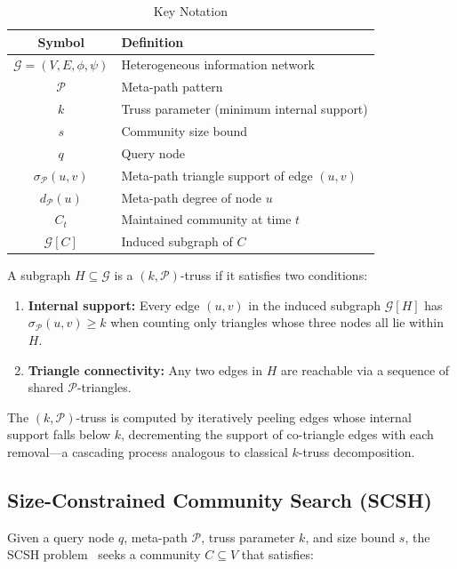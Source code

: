 \begin{table}[htbp]
\centering
\caption{Key Notation}
\label{tab:notation}
\begin{tabular}{c l}
\toprule
Symbol & Definition \\
\midrule
$\mathcal{G} = (V, E, \phi, \psi)$ & Heterogeneous information network \\
$\mathcal{P}$ & Meta-path pattern \\
$k$ & Truss parameter (minimum internal support) \\
$s$ & Community size bound \\
$q$ & Query node \\
$\sigma_{\mathcal{P}}(u,v)$ & Meta-path triangle support of edge $(u,v)$ \\
$d_{\mathcal{P}}(u)$ & Meta-path degree of node $u$ \\
$C_t$ & Maintained community at time $t$ \\
$\mathcal{G}[C]$ & Induced subgraph of $C$ \\
\bottomrule
\end{tabular}
\end{table}

A subgraph $H \subseteq \mathcal{G}$ is a $(k,\mathcal{P})$-truss if it satisfies two conditions:

\begin{enumerate}
\item \textbf{Internal support:} Every edge $(u,v)$ in the induced subgraph $\mathcal{G}[H]$ has $\sigma_{\mathcal{P}}(u,v) \geq k$ when counting only triangles whose three nodes all lie within $H$.
\item \textbf{Triangle connectivity:} Any two edges in $H$ are reachable via a sequence of shared $\mathcal{P}$-triangles.
\end{enumerate}

The $(k,\mathcal{P})$-truss is computed by iteratively peeling edges whose internal support falls below $k$, decrementing the support of co-triangle edges with each removal---a cascading process analogous to classical $k$-truss decomposition.

\subsection{Size-Constrained Community Search (SCSH)}

Given a query node $q$, meta-path $\mathcal{P}$, truss parameter $k$, and size bound $s$, the SCSH problem~\cite{zhang2025scsh} seeks a community $C \subseteq V$ that satisfies:

